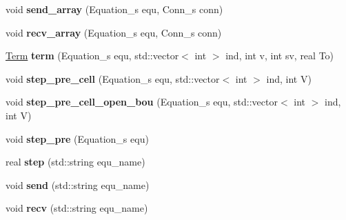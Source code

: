 \begin{DoxyCompactItemize}
\item 
\hypertarget{classFace_afdbbc9947c0d7cd84b427bd7b503b15b}{void {\bfseries send\-\_\-array} (Equation\-\_\-s equ, Conn\-\_\-s conn)}\label{classFace_afdbbc9947c0d7cd84b427bd7b503b15b}

\item 
\hypertarget{classFace_a57bdfcf1ebf5e208b611f98b7ddeca00}{void {\bfseries recv\-\_\-array} (Equation\-\_\-s equ, Conn\-\_\-s conn)}\label{classFace_a57bdfcf1ebf5e208b611f98b7ddeca00}

\item 
\hypertarget{classFace_aa827a7d26d1b90507bb4252830b3ecf5}{\hyperlink{structTerm}{Term} {\bfseries term} (Equation\-\_\-s equ, std\-::vector$<$ int $>$ ind, int v, int sv, real To)}\label{classFace_aa827a7d26d1b90507bb4252830b3ecf5}

\item 
\hypertarget{classFace_aba0d776b0f0e7cceee8729825347b5cc}{void {\bfseries step\-\_\-pre\-\_\-cell} (Equation\-\_\-s equ, std\-::vector$<$ int $>$ ind, int V)}\label{classFace_aba0d776b0f0e7cceee8729825347b5cc}

\item 
\hypertarget{classFace_a2bafbcce9f57fd3bdefd9f23a62c853d}{void {\bfseries step\-\_\-pre\-\_\-cell\-\_\-open\-\_\-bou} (Equation\-\_\-s equ, std\-::vector$<$ int $>$ ind, int V)}\label{classFace_a2bafbcce9f57fd3bdefd9f23a62c853d}

\item 
\hypertarget{classFace_a8af2298846b8a666332f00de91796844}{void {\bfseries step\-\_\-pre} (Equation\-\_\-s equ)}\label{classFace_a8af2298846b8a666332f00de91796844}

\item 
\hypertarget{classFace_a62a7d504c1e99dfc928b7e27b544893b}{real {\bfseries step} (std\-::string equ\-\_\-name)}\label{classFace_a62a7d504c1e99dfc928b7e27b544893b}

\item 
\hypertarget{classFace_a781b3843f33507116afa741579317e83}{void {\bfseries send} (std\-::string equ\-\_\-name)}\label{classFace_a781b3843f33507116afa741579317e83}

\item 
\hypertarget{classFace_a4c67c45fa975e6fb3bc3d4ee0fa6a25f}{void {\bfseries recv} (std\-::string equ\-\_\-name)}\label{classFace_a4c67c45fa975e6fb3bc3d4ee0fa6a25f}

\end{DoxyCompactItemize}
